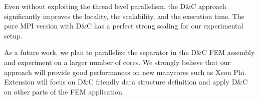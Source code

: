 \documentclass{IOS-Book-Article}
\begin{document}
Even without exploiting the thread level parallelism, the D\&C approach  significantly improves the locality, the scalability, and the execution time.
The pure MPI version with D\&C has a perfect strong scaling for our experimental setup.

As a future work, we plan to parallelize the separator in the D\&C FEM assembly and experiment on a larger number of cores.
We strongly believe that our approach will provide good performances on new manycores such as Xeon Phi.
Extension will focus on D\&C friendly data structure definition and apply D\&C on other parts of the FEM application. 


\end{document}

